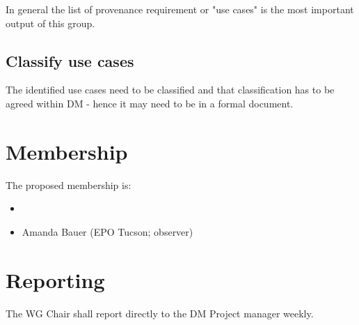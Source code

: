 In general the list of provenance requirement or  "use cases"  is the most important output of this group.
\subsection{Classify use cases}
The identified use cases need to be classified and that classification has to be agreed within DM - hence it may need to be in a formal document.



\section{Membership}

The proposed membership is:

\begin{itemize}
    \item
    \item Amanda Bauer (EPO Tucson; observer)
\end{itemize}


\section{Reporting}

The WG Chair shall report directly to the DM Project manager weekly.
